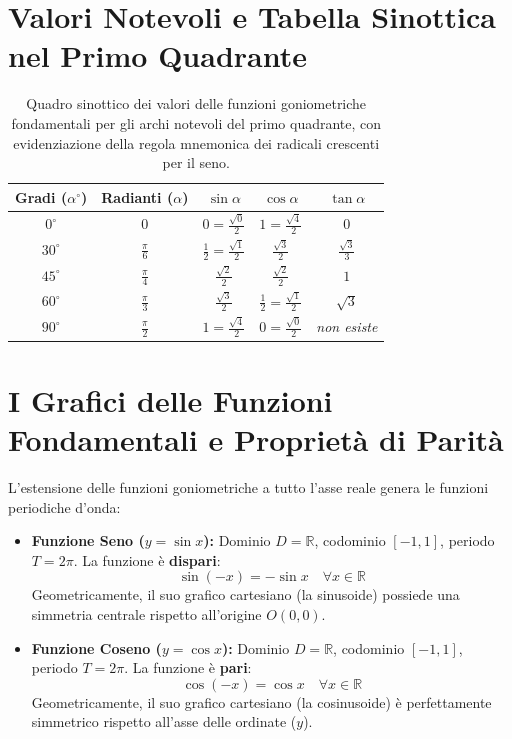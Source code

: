 \documentclass[11pt,a4paper,oneside]{report}
\renewcommand{\arraystretch}{1.4}
\begin{document}
\section{Valori Notevoli e Tabella Sinottica nel Primo Quadrante}

\begin{table}[htbp]
\centering
\renewcommand{\arraystretch}{1.3}
\begin{tabular}{ccccc}
\toprule
\textbf{Gradi ($\alpha^\circ$)} & \textbf{Radianti ($\alpha$)} & $\sin\alpha$ & $\cos\alpha$ & $\tan\alpha$ \\
\midrule
$0^\circ$ & $0$ & $0 = \frac{\sqrt{0}}{2}$ & $1 = \frac{\sqrt{4}}{2}$ & $0$ \\[3pt]
$30^\circ$ & $\frac{\pi}{6}$ & $\frac{1}{2} = \frac{\sqrt{1}}{2}$ & $\frac{\sqrt{3}}{2}$ & $\frac{\sqrt{3}}{3}$ \\[4pt]
$45^\circ$ & $\frac{\pi}{4}$ & $\frac{\sqrt{2}}{2}$ & $\frac{\sqrt{2}}{2}$ & $1$ \\[4pt]
$60^\circ$ & $\frac{\pi}{3}$ & $\frac{\sqrt{3}}{2}$ & $\frac{1}{2} = \frac{\sqrt{1}}{2}$ & $\sqrt{3}$ \\[3pt]
$90^\circ$ & $\frac{\pi}{2}$ & $1 = \frac{\sqrt{4}}{2}$ & $0 = \frac{\sqrt{0}}{2}$ & \textit{non esiste} \\
\bottomrule
\end{tabular}
\caption{Quadro sinottico dei valori delle funzioni goniometriche fondamentali per gli archi notevoli del primo quadrante, con evidenziazione della regola mnemonica dei radicali crescenti per il seno.}
\label{tab:valori_notevoli_4b}
\end{table}

\section{I Grafici delle Funzioni Fondamentali e Propriet\`a di Parit\`a}

L'estensione delle funzioni goniometriche a tutto l'asse reale genera le funzioni periodiche d'onda:
\begin{itemize}
\item \textbf{Funzione Seno ($y = \sin x$):}
Dominio $D = \mathbb{R}$, codominio $[-1, 1]$, periodo $T = 2\pi$. La funzione \`e \textbf{dispari}:
\begin{equation}
\sin(-x) = -\sin x \quad \forall x \in \mathbb{R}
\end{equation}
Geometricamente, il suo grafico cartesiano (la sinusoide) possiede una simmetria centrale rispetto all'origine $O(0, 0)$.

\item \textbf{Funzione Coseno ($y = \cos x$):}
Dominio $D = \mathbb{R}$, codominio $[-1, 1]$, periodo $T = 2\pi$. La funzione \`e \textbf{pari}:
\begin{equation}
\cos(-x) = \cos x \quad \forall x \in \mathbb{R}
\end{equation}
Geometricamente, il suo grafico cartesiano (la cosinusoide) \`e perfettamente simmetrico rispetto all'asse delle ordinate ($y$).
\end{itemize}
\end{document}
